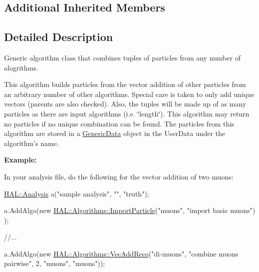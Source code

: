\subsection*{Additional Inherited Members}


\subsection{Detailed Description}
Generic algorithm class that combines tuples of particles from any number of alogrithms. 

This algorithm builds particles from the vector addition of other particles from an arbitrary number of other algorithms. Special care is taken to only add unique vectors (parents are also checked). Also, the tuples will be made up of as many particles as there are input algorithms (i.\-e. \char`\"{}length\char`\"{}). This algorithm may return no particles if no unique combination can be found. The particles from this algorithm are stored in a \hyperlink{class_h_a_l_1_1_generic_data}{Generic\-Data} object in the User\-Data under the algorithm's name.\par
\par
 {\bfseries Example\-:}\par
 In your analysis file, do the following for the vector addition of two muons\-:


\begin{DoxyCode}
\hyperlink{class_h_a_l_1_1_analysis}{HAL::Analysis} a(\textcolor{stringliteral}{"sample analysis"}, \textcolor{stringliteral}{""}, \textcolor{stringliteral}{"truth"});

a.AddAlgo(\textcolor{keyword}{new} \hyperlink{class_h_a_l_1_1_algorithms_1_1_import_particle}{HAL::Algorithms::ImportParticle}(\textcolor{stringliteral}{"muons"}, \textcolor{stringliteral}{"import basic muons"})
      );

\textcolor{comment}{//...}

a.AddAlgo(\textcolor{keyword}{new} \hyperlink{class_h_a_l_1_1_algorithms_1_1_vec_add_reco}{HAL::Algorithms::VecAddReco}(\textcolor{stringliteral}{"di-muons"}, \textcolor{stringliteral}{"combine muons pairwise"}, 
                                          2,
                                          \textcolor{stringliteral}{"muons"}, \textcolor{stringliteral}{"muons"}));
\end{DoxyCode}
 


